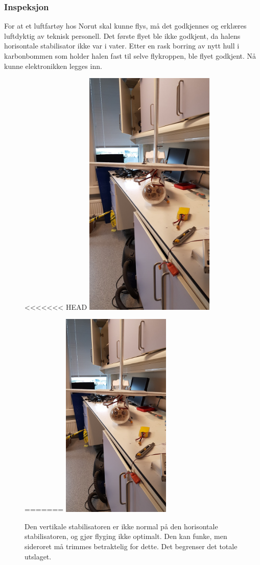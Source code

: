 \documentclass[12pt, a4paper]{article}
\begin{document}
\subsubsection{Inspeksjon}
For at et luftfartøy hos Norut skal kunne flys, må det godkjennes og erklæres luftdyktig av teknisk personell. Det første flyet ble ikke godkjent, da halens horisontale stabilisator ikke var i vater. Etter en rask borring av nytt hull i karbonbommen som holder halen fast til selve flykroppen, ble flyet godkjent. Nå kunne elektronikken legges inn. \\

\begin{figure}[ht]
	\centering
<<<<<<< HEAD
	\includegraphics[width = .6\textwidth, height = 12cm]{bilder/skjev_halefinne.jpg}
	\caption{Den vertikale stabilisatoren er ikke normal på den horisontale stabilisatoren, og gjør flyging ikke optimalt. Den kan funke, men sideroret må trimmes betraktelig for dette. Det begrenser det totale utslaget.}
=======
	\includegraphics[width = .5\textwidth, height = 10cm]{bilder/skjev_halefinne.jpg}

\end{figure}
\end{document}
